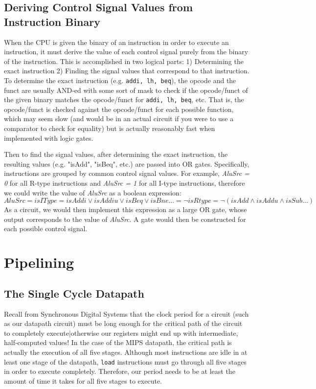 \documentclass{article}
\begin{document}
\subsection{Deriving Control Signal Values from Instruction Binary}
When the CPU is given the binary of an instruction in order to execute an instruction, it must derive the value of each control signal purely from the binary of the instruction. This is accomplished in two logical parts: 1) Determining the exact instruction 2) Finding the signal values that correspond to that instruction. To determine the exact instruction (e.g. \texttt{addi, lh, beq}), the opcode and the funct are usually AND-ed with some sort of mask to check if the opcode/funct of the given binary matches the opcode/funct for \texttt{addi, lh, beq}, etc. That is, the opcode/funct is checked against the opcode/funct for each possible function, which may seem slow (and would be in an actual circuit if you were to use a comparator to check for equality) but is actually reasonably fast when implemented with logic gates. 

Then to find the signal values, after determining the exact instruction, the resulting values (e.g. "isAdd", "isBeq", etc.) are passed into OR gates. Specifically, instructions are grouped by common control signal values. For example, \textit{AluSrc = 0} for all R-type instructions and \textit{AluSrc = 1} for all I-type instructions, therefore we could write the value of \textit{AluSrc} as a boolean expression: $$AluSrc = isIType = isAddi \lor isAddiu \lor isBeq \lor isBne ... = \lnot isRtype = \lnot(isAdd \land isAddu \land isSub ...)$$ As a circuit, we would then implement this expression as a large OR gate, whose output corresponds to the value of \textit{AluSrc}. A gate would then be constructed for each possible control signal.

\section{Pipelining}

\subsection{The Single Cycle Datapath}
Recall from Synchronous Digital Systems that the clock period for a circuit (such as our datapath circuit) must be long enough for the critical path of the circuit to completely execute|otherwise our registers might end up with intermediate, half-computed values! In the case of the MIPS datapath, the critical path is actually the execution of all five stages. Although most instructions are idle in at least one stage of the datapath, \texttt{load} instructions must go through all five stages in order to execute completely. Therefore, our period needs to be at least the amount of time it takes for all five stages to execute. 
\end{document}
